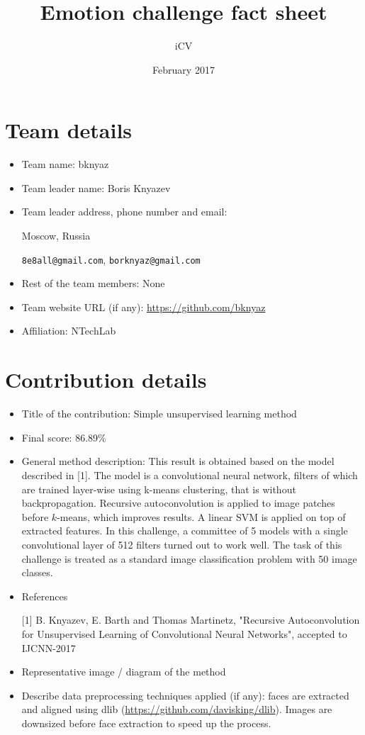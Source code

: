 \documentclass{article}
\title{Emotion challenge fact sheet}
\author{iCV}
\date{February 2017}
\begin{document}
\maketitle

\section{Team details}

\begin{itemize}
\item Team name: bknyaz                                  
\item Team leader name: Boris Knyazev                           
\item Team leader address, phone number and email: 

Moscow, Russia

\texttt{8e8all@gmail.com}, \texttt{borknyaz@gmail.com}

\item Rest of the team members: None                    
\item Team website URL (if any): \url{https://github.com/bknyaz}
\item Affiliation: NTechLab
\end{itemize}

\section{Contribution details}

\begin{itemize}
\item Title of the contribution: Simple unsupervised learning method
\item Final score: 86.89\%                                              
\item General method description: This result is obtained based on the model described in [1]. The model is a convolutional neural network, filters of which are trained layer-wise using k-means clustering, that is without backpropagation. Recursive autoconvolution is applied to image patches before $k$-means, which improves results. A linear SVM is applied on top of extracted features. In this challenge, a committee of 5 models with a single convolutional layer of 512 filters turned out to work well.
The task of this challenge is treated as a standard image classification problem with 50 image classes.

\item References

[1] B. Knyazev, E. Barth and Thomas Martinetz, "Recursive Autoconvolution for Unsupervised Learning of Convolutional Neural Networks", accepted to IJCNN-2017
\item Representative image / diagram of the method        
\item Describe data preprocessing techniques applied (if any): faces are extracted and aligned using dlib (\url{https://github.com/davisking/dlib}). Images are downsized before face extraction to speed up the process.
\end{itemize}
\end{document}
